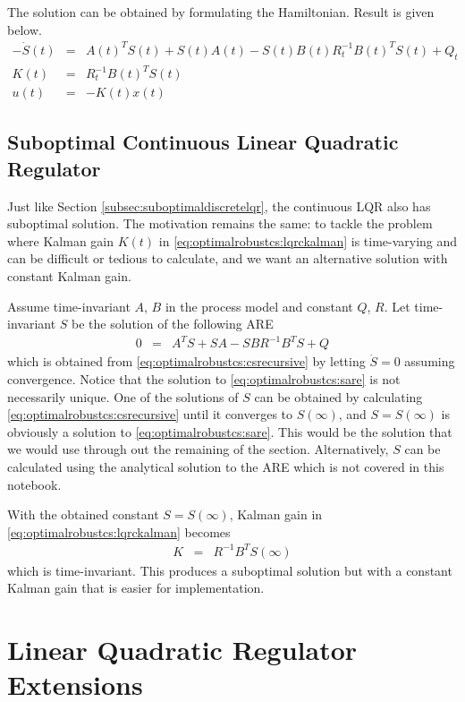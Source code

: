 The solution can be obtained by formulating the Hamiltonian. Result is given below.
\begin{eqnarray}
  -\dot{S}(t) &=& A(t)^TS(t) + S(t)A(t) - S(t)B(t)R_t^{-1}B(t)^TS(t) + Q_t \label{eq:optimalrobustcs:csrecursive} \\
  K(t) &=& R_t^{-1}B(t)^TS(t) \label{eq:optimalrobustcs:lqrckalman} \\
  u(t) &=& -K(t)x(t) \nonumber 
\end{eqnarray}

\subsection{Suboptimal Continuous Linear Quadratic Regulator}

Just like Section \ref{subsec:suboptimaldiscretelqr}, the continuous LQR also has suboptimal solution. The motivation remains the same: to tackle the problem where Kalman gain $K(t)$ in \eqref{eq:optimalrobustcs:lqrckalman} is time-varying and can be difficult or tedious to calculate, and we want an alternative solution with constant Kalman gain.

Assume time-invariant $A$, $B$ in the process model and constant $Q$, $R$. Let time-invariant $S$ be the solution of the following ARE
\begin{eqnarray}
	0 &=& A^TS + SA - SBR^{-1}B^TS + Q \label{eq:optimalrobustcs:sare}
\end{eqnarray}
which is obtained from \eqref{eq:optimalrobustcs:csrecursive} by letting $\dot{S}=0$ assuming convergence. Notice that the solution to \eqref{eq:optimalrobustcs:sare} is not necessarily unique. One of the solutions of $S$ can be obtained by calculating \eqref{eq:optimalrobustcs:csrecursive} until it converges to $S(\infty)$, and $S=S(\infty)$ is obviously a solution to \eqref{eq:optimalrobustcs:sare}. This would be the solution that we would use through out the remaining of the section. Alternatively, $S$ can be calculated using the analytical solution to the ARE which is not covered in this notebook.

With the obtained constant $S=S(\infty)$, Kalman gain in \eqref{eq:optimalrobustcs:lqrckalman} becomes
\begin{eqnarray}
	K &=& R^{-1}B^TS(\infty) \nonumber
\end{eqnarray}
which is time-invariant. This produces a suboptimal solution but with a constant Kalman gain that is easier for implementation.

\section{Linear Quadratic Regulator Extensions}

